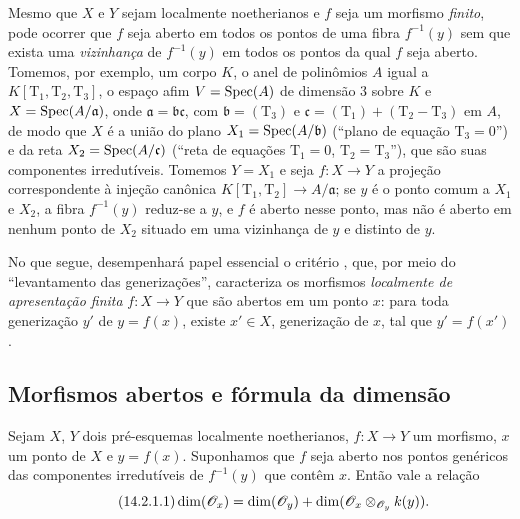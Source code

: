 \begin{remark}[14.1.5]
\label{IV.14.1.5}
Mesmo que $X$ e $Y$ sejam localmente noetherianos e $f$ seja um morfismo \emph{finito}, pode ocorrer que $f$ seja aberto em todos os pontos de uma fibra $f^{-1}(y)$ sem que exista uma \emph{vizinhança} de $f^{-1}(y)$ em todos os pontos da qual $f$ seja aberto.
Tomemos, por exemplo, um corpo $K$, o anel de polinômios $A$ igual a $K[\mathrm{T}_1,\mathrm{T}_2,\mathrm{T}_3]$, o espaço afim $V=\operatorname{Spec}(A)$ de dimensão $3$ sobre $K$ e $X=\operatorname{Spec}(A/\mathfrak{a})$, onde $\mathfrak{a}=\mathfrak{b}\mathfrak{c}$, com $\mathfrak{b}=(\mathrm{T}_3)$ e $\mathfrak{c}=(\mathrm{T}_1)+(\mathrm{T}_2-\mathrm{T}_3)$ em $A$, de modo que $X$ é a união do plano $X_1=\operatorname{Spec}(A/\mathfrak{b})$ (“plano de equação $\mathrm{T}_3=0$”) e da reta $X_2=\operatorname{Spec}(A/\mathfrak{c})$ (“reta de equações $\mathrm{T}_1=0$, $\mathrm{T}_2=\mathrm{T}_3$”), que são suas componentes irredutíveis.
Tomemos $Y=X_1$ e seja $f:X\to Y$ a projeção correspondente à injeção canônica $K[\mathrm{T}_1,\mathrm{T}_2]\to A/\mathfrak{a}$; se $y$ é o ponto comum a $X_1$ e $X_2$, a fibra $f^{-1}(y)$ reduz-se a $y$, e $f$ é aberto nesse ponto, mas não é aberto em nenhum ponto de $X_2$ situado em uma vizinhança de $y$ e distinto de $y$.
\end{remark}

\begin{env}[14.1.6]
\label{IV.14.1.6}
No que segue, desempenhará papel essencial o critério , que, por meio do “levantamento das generizações”, caracteriza os morfismos \emph{localmente de apresentação finita} $f:X\to Y$ que são abertos em um ponto $x$: para toda generização $y'$ de $y=f(x)$, existe $x'\in X$, generização de $x$, tal que $y'=f(x')$.
\end{env}

\subsection{Morfismos abertos e fórmula da dimensão}
\label{subsection:IV.14.2}

\begin{theorem}[14.2.1]
\label{IV.14.2.1}
Sejam $X$, $Y$ dois pré-esquemas localmente noetherianos, $f:X\to Y$ um morfismo, $x$ um ponto de $X$ e $y=f(x)$.
Suponhamos que $f$ seja aberto nos pontos genéricos das componentes irredutíveis de $f^{-1}(y)$ que contêm $x$.
Então vale a relação
\begin{equation}
\tag{14.2.1.1}
\label{IV.14.2.1.1}
  \dim(\sh{O}_x)=\dim(\sh{O}_y)+\dim(\sh{O}_x\otimes_{\sh{O}_y}k(y)).
\end{equation}
\end{theorem}


